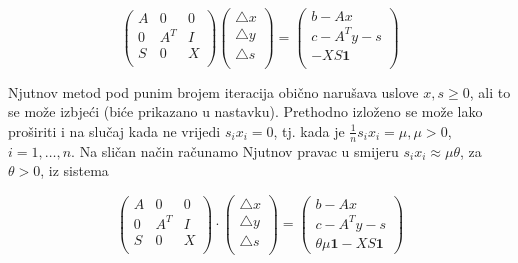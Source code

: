 \documentclass[a4paper, utf8, 11pt, colorlinks]{article}
\begin{document}
\begin{equation}
	\begin{pmatrix}
		A   & 0      &  0      \\
		0   & A^T    &  I      \\
		S   & 0      & X       \\
	\end{pmatrix}  
	\begin{pmatrix} 
		\bigtriangleup  x  \\
		\bigtriangleup  y  \\
		\bigtriangleup  s  \\
	\end{pmatrix} 
	= 
	\begin{pmatrix} 
		b - Ax             \\
		c - A^T y - s      \\
		- X S \textbf{1}  \\                   
	\end{pmatrix} 
\end{equation}

Njutnov metod pod punim brojem iteracija obično narušava uslove $x,s \geq 0$, ali to se može izbjeći (biće prikazano u nastavku).  
Prethodno izloženo se može lako proširiti i na slučaj kada ne vrijedi $s_ix_i = 0$, tj. kada je $\frac{1}{n}s_ix_i = \mu, \mu > 0$, $i=1,\ldots,n$. Na sličan način računamo Njutnov pravac u smijeru $s_i x_i \approx \mu \theta$, za  $\theta >0$, iz sistema 

\begin{equation} \label{eq:newton-interior-system-k}    
	\begin{pmatrix}
		A   & 0      &  0      \\
		0   & A^T    &  I      \\
		S   & 0      & X       \\
	\end{pmatrix} 
	\cdot 
	\begin{pmatrix}
		\bigtriangleup  x  \\
		\bigtriangleup  y  \\
		\bigtriangleup  s  \\
	\end{pmatrix} 
	=
	\begin{pmatrix}
		b - Ax           \\
		c - A^T y - s      \\
		\theta \mu \mathbf{1} - X S \textbf{1}                      
	\end{pmatrix}
\end{equation}
\end{document}
